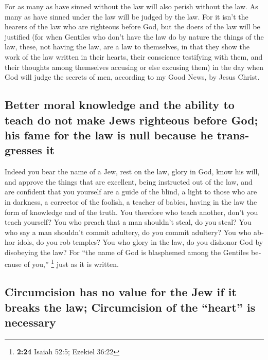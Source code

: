 \begin{paracol}{2}
\begin{otherlanguage}{english}
 For as many as have sinned without the law will also
perish without the law. As many as have sinned under the law will be
judged by the law.  For it isn't the hearers of the law
who are righteous before God, but the doers of the law will be justified
 (for when Gentiles who don't have the law do by nature
the things of the law, these, not having the law, are a law to
themselves,  in that they show the work of the law
written in their hearts, their conscience testifying with them, and
their thoughts among themselves accusing or else excusing them)
 in the day when God will judge the secrets of men,
according to my Good News, by Jesus Christ.

\hypertarget{better-moral-knowledge-and-the-ability-to-teach-do-not-make-jews-righteous-before-god-his-fame-for-the-law-is-null-because-he-transgresses-it}{%
\subsection{Better moral knowledge and the ability to teach do not make
Jews righteous before God; his fame for the law is null because he
transgresses
it}\label{better-moral-knowledge-and-the-ability-to-teach-do-not-make-jews-righteous-before-god-his-fame-for-the-law-is-null-because-he-transgresses-it}}

 Indeed you bear the name of a Jew, rest on the law,
glory in God,  know his will, and approve the things that
are excellent, being instructed out of the law,  and are
confident that you yourself are a guide of the blind, a light to those
who are in darkness,  a corrector of the foolish, a
teacher of babies, having in the law the form of knowledge and of the
truth.  You therefore who teach another, don't you teach
yourself? You who preach that a man shouldn't steal, do you steal?
 You who say a man shouldn't commit adultery, do you
commit adultery? You who abhor idols, do you rob temples?
 You who glory in the law, do you dishonor God by
disobeying the law?  For ``the name of God is blasphemed
among the Gentiles because of you,'' \footnote{\textbf{2:24} Isaiah
  52:5; Ezekiel 36:22} just as it is written.

\hypertarget{circumcision-has-no-value-for-the-jew-if-it-breaks-the-law-circumcision-of-the-heart-is-necessary}{%
\subsection{Circumcision has no value for the Jew if it breaks the law;
Circumcision of the ``heart'' is
necessary}\label{circumcision-has-no-value-for-the-jew-if-it-breaks-the-law-circumcision-of-the-heart-is-necessary}}


\end{otherlanguage}
\end{paracol}
